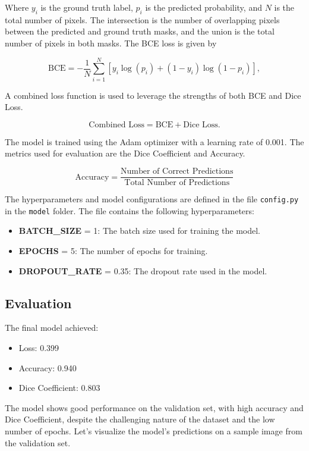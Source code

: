 \documentclass{article}
\begin{document}
Where \( y_i \) is the ground truth label, \( p_i \) is the predicted probability, and \( N \) is the total 
number of pixels. The intersection is the number of overlapping pixels between the predicted and ground truth 
masks, and the union is the total number of pixels in both masks. The BCE loss is given by

\[
\text{BCE} = -\frac{1}{N} \sum_{i=1}^{N} [y_i \log(p_i) + (1 - y_i) \log(1 - p_i)],
\]

A combined loss function is used to leverage the strengths of both BCE and Dice Loss.

\[
\text{Combined Loss} = \text{BCE} + \text{Dice Loss}.
\]

The model is trained using the Adam optimizer with a learning rate of 0.001. The metrics used for evaluation 
are the Dice Coefficient and Accuracy.

\[
\text{Accuracy} = \frac{\text{Number of Correct Predictions}}{\text{Total Number of Predictions}}
\]
\vspace{1em}

The hyperparameters and model configurations are defined in the file \texttt{config.py} in the \texttt{model} folder.
The file contains the following hyperparameters:
 
\begin{itemize}
    \item \textbf{BATCH\_SIZE} = 1: The batch size used for training the model.
    \item \textbf{EPOCHS} = 5: The number of epochs for training.
    \item \textbf{DROPOUT\_RATE} = 0.35: The dropout rate used in the model.
\end{itemize}

\subsection{Evaluation}
The final model achieved:
\begin{itemize}
    \item Loss: 0.399
    \item Accuracy: 0.940
    \item Dice Coefficient: 0.803
\end{itemize}

The model shows good performance on the validation set, with high accuracy and Dice Coefficient, 
despite the challenging nature of the dataset and the low number of epochs. Let's visualize the model's 
predictions on a sample image from the validation set.
\end{document}
